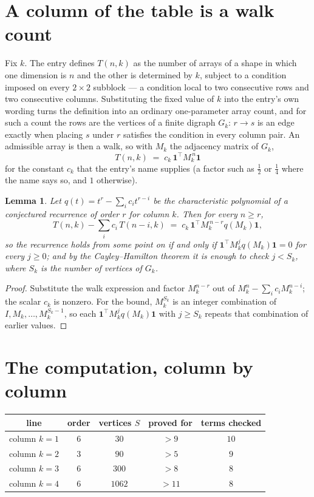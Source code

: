 \documentclass[11pt,a4paper]{article}
\theoremstyle{plain}
\newtheorem{lemma}[theorem]{Lemma}
\theoremstyle{definition}
\begin{document}
\section{A column of the table is a walk count}

Fix $k$. The entry defines $T(n,k)$ as the number of arrays of a shape in which one dimension
is $n$ and the other is determined by $k$, subject to a condition imposed on every
$2\times2$ subblock --- a condition local to two consecutive rows and two consecutive columns.
Substituting the fixed value of $k$ into the entry's own wording turns the definition into an
ordinary one-parameter array count, and for such a count the rows are the vertices of a finite
digraph $G_k$: $r\to s$ is an edge exactly when placing $s$ under $r$ satisfies the condition
in every column pair. An admissible array is then a walk, so with $M_k$ the adjacency matrix
of $G_k$,
\[
T(n,k)\;=\;c_k\,\mathbf{1}^{\!\top}M_k^{\,n}\mathbf{1}
\]
for the constant $c_k$ that the entry's name supplies (a factor such as $\tfrac12$ or
$\tfrac14$ where the name says so, and $1$ otherwise).

\begin{lemma}\label{lem:crit}
Let $q(t)=t^{r}-\sum_i c_it^{r-i}$ be the characteristic polynomial of a conjectured
recurrence of order $r$ for column $k$. Then for every $n\ge r$,
\[
T(n,k)-\sum_i c_i\,T(n-i,k)\;=\;c_k\,\mathbf{1}^{\!\top}M_k^{\,n-r}q(M_k)\mathbf{1},
\]
so the recurrence holds from some point on if and only if
$\mathbf{1}^{\!\top}M_k^{j}q(M_k)\mathbf{1}=0$ for every $j\ge0$; and by the
Cayley--Hamilton theorem it is enough to check $j<S_k$, where $S_k$ is the number of vertices
of $G_k$.
\end{lemma}

\begin{proof}
Substitute the walk expression and factor $M_k^{n-r}$ out of $M_k^{n}-\sum_ic_iM_k^{n-i}$;
the scalar $c_k$ is nonzero. For the bound, $M_k^{S_k}$ is an integer combination of
$I,M_k,\dots,M_k^{S_k-1}$, so each $\mathbf{1}^{\!\top}M_k^{j}q(M_k)\mathbf{1}$ with
$j\ge S_k$ repeats that combination of earlier values.
\end{proof}

\section{The computation, column by column}

\begin{center}
\begin{tabular}{ccccc}
line & order & vertices $S$ & proved for & terms checked \\ \hline
column $k$$=1$ & $6$ & $30$ & $>9$ & $10$ \\
column $k$$=2$ & $3$ & $90$ & $>5$ & $9$ \\
column $k$$=3$ & $6$ & $300$ & $>8$ & $8$ \\
column $k$$=4$ & $6$ & $1062$ & $>11$ & $8$ \\
\end{tabular}
\end{center}
\end{document}

